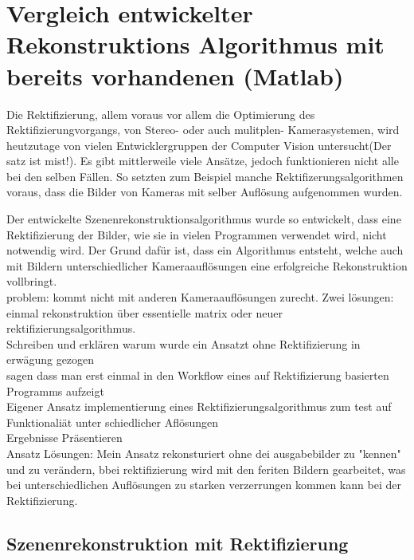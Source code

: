 \chapter{Vergleich entwickelter Rekonstruktions Algorithmus mit bereits vorhandenen (Matlab)}
\label{sec:rectification}

Die Rektifizierung, allem voraus vor allem die Optimierung des Rektifizierungvorgangs, von Stereo- oder auch mulitplen- Kamerasystemen, wird heutzutage von vielen Entwicklergruppen der Computer Vision untersucht(Der satz ist mist!). Es gibt mittlerweile viele Ansätze, jedoch funktionieren nicht alle bei den selben Fällen. So setzten zum Beispiel manche Rektifizerungsalgorithmen voraus, dass die Bilder von Kameras mit selber Auflösung aufgenommen wurden.

Der entwickelte Szenenrekonstruktionsalgorithmus wurde so entwickelt, dass eine Rektifizierung der Bilder, wie sie in vielen Programmen verwendet wird, nicht notwendig wird. Der Grund dafür ist, dass ein Algorithmus entsteht, welche auch mit Bildern unterschiedlicher Kameraauflösungen eine erfolgreiche Rekonstruktion vollbringt.\\

problem: kommt nicht mit anderen Kameraauflösungen zurecht. Zwei lösungen: einmal rekonstruktion über essentielle matrix oder neuer rektifizierungsalgorithmus.\\

Schreiben und erklären warum wurde ein Ansatzt ohne Rektifizierung in erwägung gezogen \\

sagen dass man erst einmal in den Workflow eines auf Rektifizierung basierten Programms aufzeigt\\



Eigener Ansatz implementierung eines Rektifizierungsalgorithmus zum test auf Funktionaliät unter schiedlicher Aflösungen \\

Ergebnisse Präsentieren\\

Ansatz Lösungen: Mein Ansatz rekonsturiert ohne dei ausgabebilder zu "kennen" und zu verändern, bbei rektifizierung wird mit den feriten Bildern gearbeitet, was bei unterschiedlichen Auflösungen zu starken verzerrungen kommen kann bei der Rektifizierung.

\section{Szenenrekonstruktion mit Rektifizierung}


